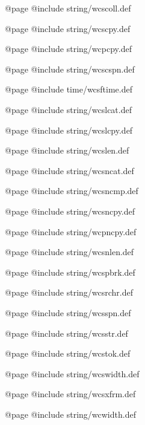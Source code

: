 @page
@include string/wcscoll.def

@page
@include string/wcscpy.def

@page
@include string/wcpcpy.def

@page
@include string/wcscspn.def

@page
@include time/wcsftime.def

@page
@include string/wcslcat.def

@page
@include string/wcslcpy.def

@page
@include string/wcslen.def

@page
@include string/wcsncat.def

@page
@include string/wcsncmp.def

@page
@include string/wcsncpy.def

@page
@include string/wcpncpy.def

@page
@include string/wcsnlen.def

@page
@include string/wcspbrk.def

@page
@include string/wcsrchr.def

@page
@include string/wcsspn.def

@page
@include string/wcsstr.def

@page
@include string/wcstok.def

@page
@include string/wcswidth.def

@page
@include string/wcsxfrm.def

@page
@include string/wcwidth.def

